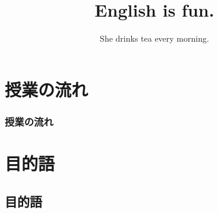 \documentclass[aspectratio=169,xcolor={dvipsnames,table}]{beamer}
\title{English is fun.}
\subtitle{She drinks tea  every morning.}
\author{}
\institute[]{}
\date[]
\begin{document}
\begin{frame}[plain]
  \titlepage
\end{frame}

\section*{授業の流れ}
\begin{frame}[plain]
  \frametitle{授業の流れ}
  \tableofcontents
\end{frame}

\section{目的語}
\subsection{目的語}
\end{document}
